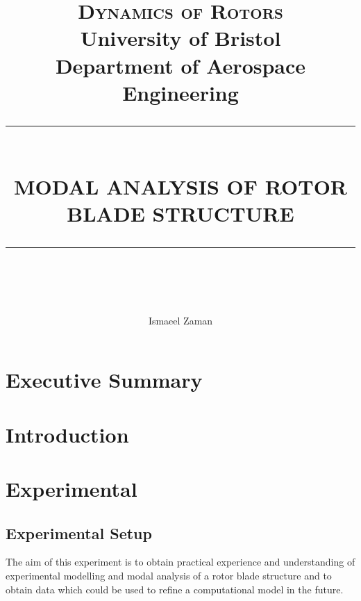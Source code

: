 \documentclass[11pt]{article}
\newcommand{\HRule}[1]{\rule{\linewidth}{#1}}
\begin{document}
\title{ \normalsize \textsc{Dynamics of Rotors}
		\\ 		University of Bristol \\
		Department of Aerospace Engineering\\ [0.5cm]
		\HRule{0.5pt} \\
		\LARGE \textbf{\uppercase{Modal Analysis of Rotor Blade Structure}}
		\HRule{2pt} \\ [0.5cm]
		\normalsize}
\author{
		Ismaeel Zaman  \\
 }
\maketitle



\section{Executive Summary}
\section{Introduction}

\newpage

\section{Experimental}
\subsection{Experimental Setup}
The aim of this experiment is to obtain practical experience and understanding of experimental modelling and modal analysis of a rotor blade structure and to obtain data which could be used to refine a computational model in the future.\\
\end{document}
